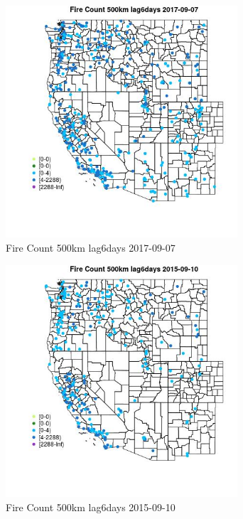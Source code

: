 \begin{figure} 
\centering  
\includegraphics[width=0.77\textwidth]{Code_Outputs/Report_ML_input_PM25_Step4_part_e_de_duplicated_aves_compiled_2019-05-21wNAs_MapObsFire_Count_500km_lag6days2017-09-07.jpg} 
\caption{\label{fig:Report_ML_input_PM25_Step4_part_e_de_duplicated_aves_compiled_2019-05-21wNAsMapObsFire_Count_500km_lag6days2017-09-07}Fire Count 500km lag6days 2017-09-07} 
\end{figure} 
 

\clearpage 

\begin{figure} 
\centering  
\includegraphics[width=0.77\textwidth]{Code_Outputs/Report_ML_input_PM25_Step4_part_e_de_duplicated_aves_compiled_2019-05-21wNAs_MapObsFire_Count_500km_lag6days2015-09-10.jpg} 
\caption{\label{fig:Report_ML_input_PM25_Step4_part_e_de_duplicated_aves_compiled_2019-05-21wNAsMapObsFire_Count_500km_lag6days2015-09-10}Fire Count 500km lag6days 2015-09-10} 
\end{figure} 
 

